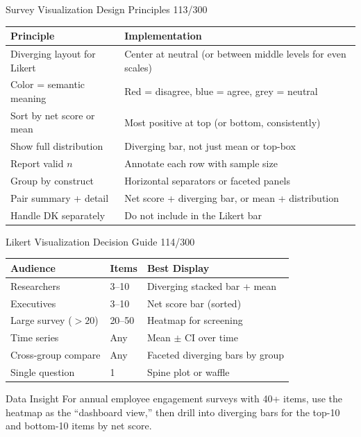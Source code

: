 \documentclass[10pt]{beamer}
\newcommand{\smark}[1]{\hfill{\scriptsize\color{codegray}#1}}
\begin{document}
\begin{frame}{Survey Visualization Design Principles}
\smark{113/300}
\centering\small
\begin{tabular}{@{}ll@{}}
    \toprule
    \textbf{Principle} & \textbf{Implementation} \\
    \midrule
    Diverging layout for Likert         & Center at neutral (or between middle levels for even scales) \\
    Color = semantic meaning             & Red = disagree, blue = agree, grey = neutral \\
    Sort by net score or mean            & Most positive at top (or bottom, consistently) \\
    Show full distribution               & Diverging bar, not just mean or top-box \\
    Report valid $n$                     & Annotate each row with sample size \\
    Group by construct                   & Horizontal separators or faceted panels \\
    Pair summary + detail                & Net score + diverging bar, or mean + distribution \\
    Handle DK separately                 & Do not include in the Likert bar \\
    \bottomrule
\end{tabular}
\end{frame}

\begin{frame}{Likert Visualization Decision Guide}
\smark{114/300}
\centering\small
\begin{tabular}{@{}lll@{}}
    \toprule
    \textbf{Audience} & \textbf{Items} & \textbf{Best Display} \\
    \midrule
    Researchers          & 3--10     & Diverging stacked bar + mean \\
    Executives           & 3--10     & Net score bar (sorted) \\
    Large survey ($>20$) & 20--50    & Heatmap for screening \\
    Time series          & Any       & Mean $\pm$ CI over time \\
    Cross-group compare  & Any       & Faceted diverging bars by group \\
    Single question      & 1         & Spine plot or waffle \\
    \bottomrule
\end{tabular}

\vspace{0.3cm}
\begin{exampleblock}{Data Insight}
    \scriptsize For annual employee engagement surveys with 40+ items, use the heatmap as the ``dashboard view,'' then drill into diverging bars for the top-10 and bottom-10 items by net score.
\end{exampleblock}
\end{frame}
\end{document}
